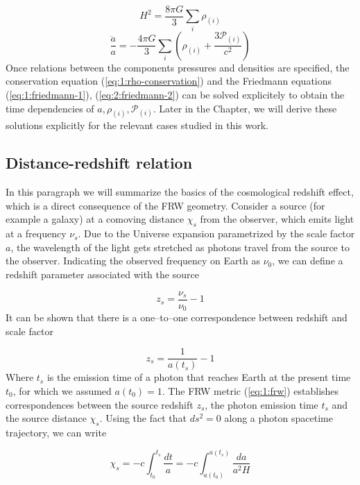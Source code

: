 \begin{equation}
\label{eq:1:friedmann-1}
H^2 = \frac{8\pi G}{3}\sum_i\rho_{(i)}
\end{equation} 
%
\begin{equation}
\label{eq:2:friedmann-2}
\frac{\ddot{a}}{a} = -\frac{4\pi G}{3}\sum_i\left(\rho_{(i)}+\frac{3\mathcal{P}_{(i)}}{c^2}\right)
\end{equation}
%
Once relations between the components pressures and densities are specified, the conservation equation (\ref{eq:1:rho-conservation}) and the Friedmann equations (\ref{eq:1:friedmann-1}), (\ref{eq:2:friedmann-2}) can be solved explicitely to obtain the time dependencies of $a,\rho_{(i)},\mathcal{P}_{(i)}$. Later in the Chapter, we will derive these solutions explicitly for the relevant cases studied in this work.  

\subsection{Distance-redshift relation}
In this paragraph we will summarize the basics of the cosmological redshift effect, which is a direct consequence of the FRW geometry. Consider a source (for example a galaxy) at a comoving distance $\chi_s$ from the observer, which emits light at a frequency $\nu_s$. Due to the Universe expansion parametrized by the scale factor $a$, the wavelength of the light gets stretched as photons travel from the source to the observer. Indicating the observed frequency on Earth as $\nu_0$, we can define a redshift parameter associated with the source

\begin{equation}
\label{eq:1:redshift}
z_s = \frac{\nu_s}{\nu_0}-1
\end{equation}  
%
It can be shown that there is a one--to--one correspondence between redshift and scale factor

\begin{equation}
\label{eq:1:z-a}
z_s = \frac{1}{a(t_s)}-1
\end{equation}
%
Where $t_s$ is the emission time of a photon that reaches Earth at the present time $t_0$, for which we assumed $a(t_0)=1$. The FRW metric (\ref{eq:1:frw}) establishes correspondences between the source redshift $z_s$, the photon emission time $t_s$ and the source distance $\chi_s$. Using the fact that $ds^2=0$ along a photon spacetime trajectory, we can write

\begin{equation}
\label{eq:1:chi-a}
\chi_s = -c\int_{t_0}^{t_s}\frac{dt}{a} = -c\int_{a(t_0)}^{a(t_s)}\frac{da}{a^2H}  
\end{equation}

